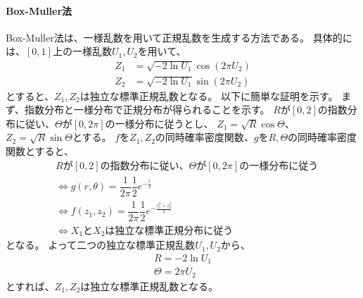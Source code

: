 \paragraph{Box-Muller法}
Box-Muller法は、一様乱数を用いて正規乱数を生成する方法である。
具体的には、$[0, 1]$上の一様乱数$U_1, U_2$を用いて、
\begin{equation}\label{eq:box-muller}
	\begin{split}
		Z_1 & = \sqrt{-2\ln U_1} \cos(2\pi U_2) \\
		Z_2 & = \sqrt{-2\ln U_1} \sin(2\pi U_2)
	\end{split}
\end{equation}
とすると、$Z_1, Z_2$は独立な標準正規乱数となる。
以下に簡単な証明を示す。
まず、指数分布と一様分布で正規分布が得られることを示す。
$R$が$[0, 2]$の指数分布に従い、$\Theta$が$[0, 2\pi]$の一様分布に従うとし、
$Z_1 = \sqrt{R}\cos\Theta$、$Z_2 = \sqrt{R}\sin\Theta$とする。
$f$を$Z_1, Z_2$の同時確率密度関数、$g$を$R, \Theta$の同時確率密度関数とすると、
\begin{equation*}
	\begin{split}
		 & \text{$R$が$[0, 2]$の指数分布に従い、$\Theta$が$[0, 2\pi]$の一様分布に従う}                                \\
		 & \Leftrightarrow g(r, \theta) = \dfrac{1}{2\pi} \dfrac{1}{2} e^{-\frac{r}{2}}            \\
		 & \Leftrightarrow f(z_1, z_2) = \dfrac{1}{2\pi} \dfrac{1}{2} e^{-\frac{z_1^2 + z_2^2}{2}} \\
		 & \Leftrightarrow \text{$X_1$と$X_2$は独立な標準正規分布に従う}
	\end{split}
\end{equation*}
となる。
よって二つの独立な標準正規乱数$U_1, U_2$から、
\begin{equation*}
	\begin{split}
		R = -2\ln U_1 \\
		\Theta = 2\pi U_2
	\end{split}
\end{equation*}
とすれば、$Z_1, Z_2$は独立な標準正規乱数となる。
